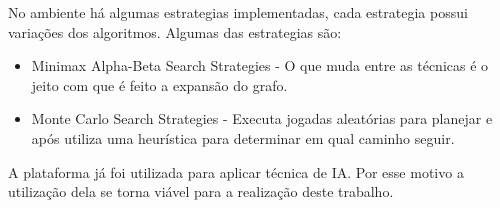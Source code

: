 No ambiente há algumas estrategias implementadas, cada estrategia possui variações dos algoritmos. Algumas das estrategias são:
 \begin{itemize}
 	\item Minimax Alpha-Beta Search Strategies - O que muda entre as técnicas é o jeito com que é feito a expansão do grafo.
 	\item Monte Carlo Search Strategies - Executa jogadas aleatórias para planejar e após utiliza uma heurística para determinar em qual caminho seguir.
 \end{itemize}
 
A plataforma já foi utilizada para aplicar técnica de IA. Por esse motivo a utilização dela se torna viável para a realização deste trabalho. 
 
 
 
 